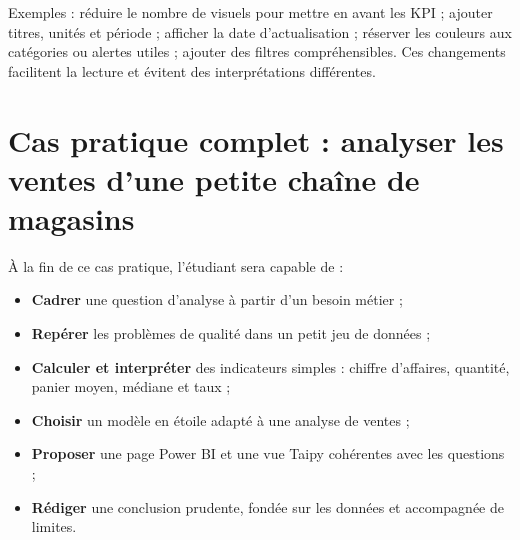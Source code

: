 \documentclass[
  french,
  letterpaper,
  open=any]{scrbook}
\providecommand{\tightlist}{%
  \setlength{\itemsep}{0pt}\setlength{\parskip}{0pt}}
\theoremstyle{definition}
\theoremstyle{definition}
\theoremstyle{remark}
\begin{document}
\begin{tcolorbox}[enhanced jigsaw, arc=.35mm, bottomrule=.15mm, bottomtitle=1mm, breakable, colback=white, colbacktitle=quarto-callout-tip-color!10!white, colframe=quarto-callout-tip-color-frame, coltitle=black, left=2mm, leftrule=.75mm, opacityback=0, opacitybacktitle=0.6, rightrule=.15mm, title=\textcolor{quarto-callout-tip-color}{\faLightbulb}\hspace{0.5em}{Solution de l'exercice Exercice~\ref{exr-bi-8}}, titlerule=0mm, toprule=.15mm, toptitle=1mm]

Exemples : réduire le nombre de visuels pour mettre en avant les KPI ;
ajouter titres, unités et période ; afficher la date d'actualisation ;
réserver les couleurs aux catégories ou alertes utiles ; ajouter des
filtres compréhensibles. Ces changements facilitent la lecture et
évitent des interprétations différentes.

\end{tcolorbox}


\chapter{Cas pratique complet : analyser les ventes d'une petite chaîne
de
magasins}\label{cas-pratique-complet-analyser-les-ventes-dune-petite-chauxeene-de-magasins}

\begin{tcolorbox}[enhanced jigsaw, arc=.35mm, bottomrule=.15mm, bottomtitle=1mm, breakable, colback=white, colbacktitle=quarto-callout-tip-color!10!white, colframe=quarto-callout-tip-color-frame, coltitle=black, left=2mm, leftrule=.75mm, opacityback=0, opacitybacktitle=0.6, rightrule=.15mm, title=\textcolor{quarto-callout-tip-color}{\faLightbulb}\hspace{0.5em}{Objectifs du chapitre}, titlerule=0mm, toprule=.15mm, toptitle=1mm]

À la fin de ce cas pratique, l'étudiant sera capable de :

\begin{itemize}
\tightlist
\item
  \textbf{Cadrer} une question d'analyse à partir d'un besoin métier ;
\item
  \textbf{Repérer} les problèmes de qualité dans un petit jeu de données
  ;
\item
  \textbf{Calculer et interpréter} des indicateurs simples : chiffre
  d'affaires, quantité, panier moyen, médiane et taux ;
\item
  \textbf{Choisir} un modèle en étoile adapté à une analyse de ventes ;
\item
  \textbf{Proposer} une page Power BI et une vue Taipy cohérentes avec
  les questions ;
\item
  \textbf{Rédiger} une conclusion prudente, fondée sur les données et
  accompagnée de limites.
\end{itemize}

\end{tcolorbox}
\end{document}

